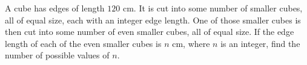 A cube has edges of length $120$ cm. It is cut into some number of smaller cubes, all of equal size, each with an integer edge length. One of those smaller cubes is then cut into some number of even smaller cubes, all of equal size. If the edge length of each of the even smaller cubes is $n$ cm, where $n$ is an integer, find the number of possible values of $n$.
